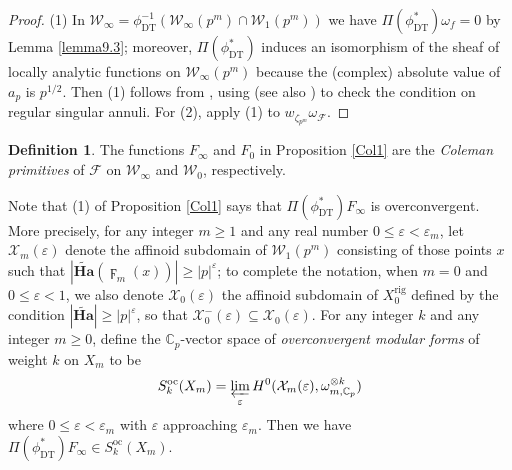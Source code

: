 \documentclass[a4paper,11pt]{amsart}
\numberwithin{equation}{section}
\theoremstyle{plain}
\theoremstyle{definition}
\newtheorem{definition}[theorem]{Definition}
\theoremstyle{remark}
\newcommand{\C}{\mathbb C}
\newcommand{\rig}{\mathrm{rig}}
\newcommand{\invlim}{\mathop{\varprojlim}\limits}
\begin{document}
\begin{proof} (1) In  
${\mathcal{W}}_\infty=\phi_{\mathrm{DT}}^{-1}(\mathcal{W}_\infty(p^m)\cap\mathcal{W}_1(p^m))$ we have $\Pi(\phi_{\mathrm{DT}}^*)\omega_f=0$ by Lemma \ref{lemma9.3}; moreover, $\Pi(\phi_{\mathrm{DT}}^*)$ induces an isomorphism of the sheaf of locally analytic functions on $\mathcal{W}_\infty(p^m)$ because  the (complex) absolute value of $a_p$ is $p^{1/2}$. Then (1) follows from \cite[Theorem 8.1]{Coleman-Shimura}, using \cite[Proposition 3.1.2]{Katz-Dwork} (see also \cite[Lemma 5.1]{CI}) to check the condition on regular singular annuli. For (2), apply (1) to $w_{\zeta_{p^m}}\omega_\mathcal{F}$. \end{proof}

\begin{definition}\label{defCol}
The functions $F_{\infty}$ and $F_{0}$ in Proposition \ref{Col1} are the \emph{Coleman primitives} of $\mathcal{F}$ on $\mathcal{W}_\infty$ and $\mathcal{W}_0$, respectively.  
\end{definition} 

Note that (1) of Proposition \ref{Col1} says that 
$\Pi(\phi_{\mathrm{DT}}^*)F_{\infty}$ is overconvergent. More precisely, 
for any integer $m\geq1$ and any real number $0\leq \varepsilon<\varepsilon_m$, let $\mathcal{X}_m(\varepsilon)$ denote the affinoid subdomain of $\mathcal{W}_1(p^m)$ consisting of those points $x$ such that $|\widetilde{\mathbf{Ha}}(\digamma_m(x))|\geq |p|^{\varepsilon}$; to complete the notation, when 
$m=0$ and $0\leq \varepsilon<1$, we also denote $\mathcal{X}_0(\varepsilon)$ the affinoid subdomain of ${X}_0^\rig$ defined by the condition $|\widetilde{\mathbf{Ha}}|\geq |p|^{\varepsilon}$, so that $\mathcal{X}_0^-(\varepsilon)\subseteq \mathcal{X}_0(\varepsilon)$. 
For any integer $k$ and any integer $m\geq 0$,  
define the $\C_p$-vector space of \emph{overconvergent modular forms} of weight $k$ on ${X}_m$ to be 
\[S_k^\mathrm{oc}({X}_m)=\invlim_{\varepsilon} H^0(\mathcal{X}_m(\varepsilon),\omega_{m,\C_p}^{\otimes k})\]
where $0\leq\varepsilon<\varepsilon_m$ with $\varepsilon$ approaching $\varepsilon_m$.  
Then we have $\Pi(\phi_{\mathrm{DT}}^*)F_{\infty}\in  S_k^\mathrm{oc}({X}_m)$. 
\end{document}
